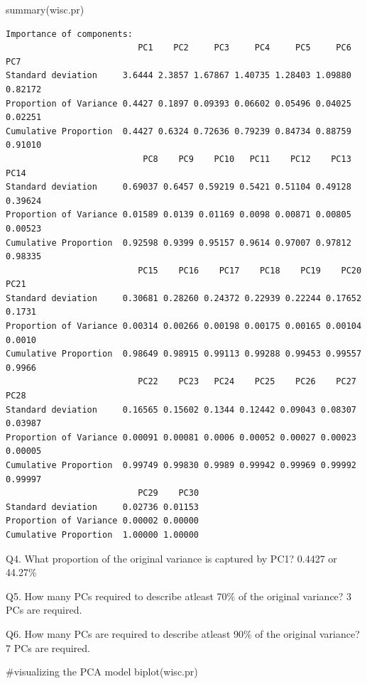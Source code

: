 \documentclass[
  letterpaper,
  DIV=11,
  numbers=noendperiod]{scrartcl}
\newenvironment{Shaded}{\begin{snugshade}}{\end{snugshade}}
\newcommand{\CommentTok}[1]{\textcolor[rgb]{0.37,0.37,0.37}{#1}}
\newcommand{\FunctionTok}[1]{\textcolor[rgb]{0.28,0.35,0.67}{#1}}
\newcommand{\NormalTok}[1]{\textcolor[rgb]{0.00,0.23,0.31}{#1}}
\begin{document}
\begin{Shaded}
\begin{Highlighting}[]
\FunctionTok{summary}\NormalTok{(wisc.pr)}
\end{Highlighting}
\end{Shaded}

\begin{verbatim}
Importance of components:
                          PC1    PC2     PC3     PC4     PC5     PC6     PC7
Standard deviation     3.6444 2.3857 1.67867 1.40735 1.28403 1.09880 0.82172
Proportion of Variance 0.4427 0.1897 0.09393 0.06602 0.05496 0.04025 0.02251
Cumulative Proportion  0.4427 0.6324 0.72636 0.79239 0.84734 0.88759 0.91010
                           PC8    PC9    PC10   PC11    PC12    PC13    PC14
Standard deviation     0.69037 0.6457 0.59219 0.5421 0.51104 0.49128 0.39624
Proportion of Variance 0.01589 0.0139 0.01169 0.0098 0.00871 0.00805 0.00523
Cumulative Proportion  0.92598 0.9399 0.95157 0.9614 0.97007 0.97812 0.98335
                          PC15    PC16    PC17    PC18    PC19    PC20   PC21
Standard deviation     0.30681 0.28260 0.24372 0.22939 0.22244 0.17652 0.1731
Proportion of Variance 0.00314 0.00266 0.00198 0.00175 0.00165 0.00104 0.0010
Cumulative Proportion  0.98649 0.98915 0.99113 0.99288 0.99453 0.99557 0.9966
                          PC22    PC23   PC24    PC25    PC26    PC27    PC28
Standard deviation     0.16565 0.15602 0.1344 0.12442 0.09043 0.08307 0.03987
Proportion of Variance 0.00091 0.00081 0.0006 0.00052 0.00027 0.00023 0.00005
Cumulative Proportion  0.99749 0.99830 0.9989 0.99942 0.99969 0.99992 0.99997
                          PC29    PC30
Standard deviation     0.02736 0.01153
Proportion of Variance 0.00002 0.00000
Cumulative Proportion  1.00000 1.00000
\end{verbatim}

Q4. What proportion of the original variance is captured by PC1? 0.4427
or 44.27\%

Q5. How many PCs required to describe atleast 70\% of the original
variance? 3 PCs are required.

Q6. How many PCs are required to describe atleast 90\% of the original
variance? 7 PCs are required.

\begin{Shaded}
\begin{Highlighting}[]
\CommentTok{\#visualizing the PCA model }
\FunctionTok{biplot}\NormalTok{(wisc.pr)}
\end{Highlighting}
\end{Shaded}
\end{document}
